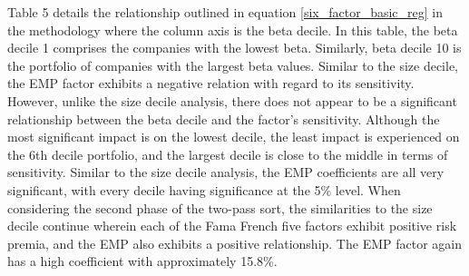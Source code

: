 Table 5 details the relationship outlined in equation \eqref{six_factor_basic_reg} in the methodology where the column axis is the beta decile. In this table,  the beta decile 1 comprises the companies with the lowest beta. Similarly, beta decile 10 is the portfolio of companies with the largest beta values.  Similar to the size decile, the EMP factor exhibits a negative relation with regard to its sensitivity. However, unlike the size decile analysis, there does not appear to be a significant relationship between the beta decile and the factor's sensitivity. Although the most significant impact is on the lowest decile, the least impact is experienced on the 6th decile portfolio, and the largest decile is close to the middle in terms of sensitivity. Similar to the size decile analysis, the EMP coefficients are all very significant, with every decile having significance at the 5\% level. When considering the second phase of the two-pass sort, the similarities to the size decile continue wherein each of the Fama French five factors exhibit positive risk premia, and the EMP also exhibits a positive relationship. The EMP factor again has a high coefficient with approximately 15.8\%. 
